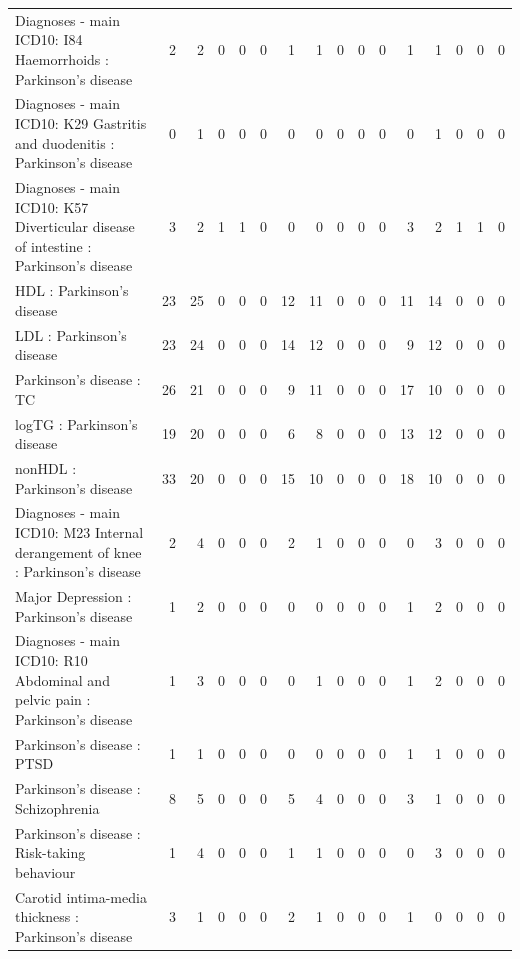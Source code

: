 \begin{table}[ht]
\begin{tabular}{lrrrrrrrrrrrrrrr}
  Diagnoses - main ICD10: I84 Haemorrhoids : Parkinson's disease &   2 &   2 &   0 &   0 &   0 &   1 &   1 &   0 &   0 &   0 &   1 &   1 &   0 &   0 &   0 \\ 
  Diagnoses - main ICD10: K29 Gastritis and duodenitis : Parkinson's disease &   0 &   1 &   0 &   0 &   0 &   0 &   0 &   0 &   0 &   0 &   0 &   1 &   0 &   0 &   0 \\ 
  Diagnoses - main ICD10: K57 Diverticular disease of intestine : Parkinson's disease &   3 &   2 &   1 &   1 &   0 &   0 &   0 &   0 &   0 &   0 &   3 &   2 &   1 &   1 &   0 \\ 
  HDL : Parkinson's disease &  23 &  25 &   0 &   0 &   0 &  12 &  11 &   0 &   0 &   0 &  11 &  14 &   0 &   0 &   0 \\ 
  LDL : Parkinson's disease &  23 &  24 &   0 &   0 &   0 &  14 &  12 &   0 &   0 &   0 &   9 &  12 &   0 &   0 &   0 \\ 
  Parkinson's disease : TC &  26 &  21 &   0 &   0 &   0 &   9 &  11 &   0 &   0 &   0 &  17 &  10 &   0 &   0 &   0 \\ 
  logTG : Parkinson's disease &  19 &  20 &   0 &   0 &   0 &   6 &   8 &   0 &   0 &   0 &  13 &  12 &   0 &   0 &   0 \\ 
  nonHDL : Parkinson's disease &  33 &  20 &   0 &   0 &   0 &  15 &  10 &   0 &   0 &   0 &  18 &  10 &   0 &   0 &   0 \\ 
  Diagnoses - main ICD10: M23 Internal derangement of knee : Parkinson's disease &   2 &   4 &   0 &   0 &   0 &   2 &   1 &   0 &   0 &   0 &   0 &   3 &   0 &   0 &   0 \\ 
  Major Depression : Parkinson's disease &   1 &   2 &   0 &   0 &   0 &   0 &   0 &   0 &   0 &   0 &   1 &   2 &   0 &   0 &   0 \\ 
  Diagnoses - main ICD10: R10 Abdominal and pelvic pain : Parkinson's disease &   1 &   3 &   0 &   0 &   0 &   0 &   1 &   0 &   0 &   0 &   1 &   2 &   0 &   0 &   0 \\ 
  Parkinson's disease : PTSD &   1 &   1 &   0 &   0 &   0 &   0 &   0 &   0 &   0 &   0 &   1 &   1 &   0 &   0 &   0 \\ 
  Parkinson's disease : Schizophrenia &   8 &   5 &   0 &   0 &   0 &   5 &   4 &   0 &   0 &   0 &   3 &   1 &   0 &   0 &   0 \\ 
  Parkinson's disease : Risk-taking behaviour &   1 &   4 &   0 &   0 &   0 &   1 &   1 &   0 &   0 &   0 &   0 &   3 &   0 &   0 &   0 \\ 
  Carotid intima-media thickness : Parkinson's disease &   3 &   1 &   0 &   0 &   0 &   2 &   1 &   0 &   0 &   0 &   1 &   0 &   0 &   0 &   0 \\ 

\end{tabular}
\end{table}
